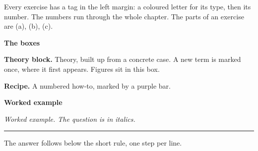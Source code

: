 \noindent Every exercise has a tag in the left margin: a coloured letter for its type, then its number. The numbers run through the whole
chapter. The parts of an exercise are (a), (b), (c).

\medskip\noindent\textbf{The boxes}\par\smallskip
\begin{tcolorbox}[enhanced, sharp corners, colback=yellow!15, colframe=yellow!15, boxrule=0pt, left=8pt, right=8pt, top=4pt, bottom=4pt, before skip=5pt, after skip=0pt]
\textbf{\color{chapcolor}Theory block.} Theory, built up from a concrete case. A new term is marked once, where it first appears.
Figures sit in this box.
\begin{recipebox}
\textbf{Recipe.} A numbered how-to, marked by a purple bar.
\end{recipebox}
\end{tcolorbox}
\begin{workedbox}
\textbf{Worked example}\par\smallskip\noindent\itshape Worked example. The question is in italics.

\par\upshape\smallskip\noindent\rule{2.5em}{0.6pt}\par\smallskip\noindent The answer follows below the short rule, one step per line.
\end{workedbox}
\medskip

